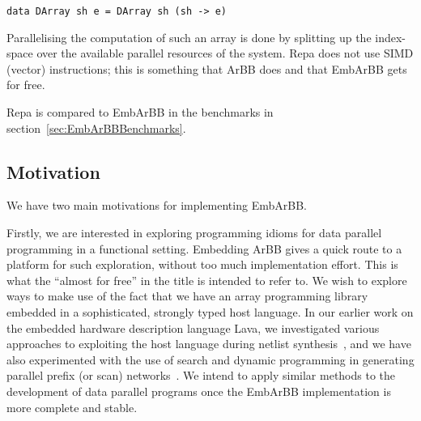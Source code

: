 \begin{verbatim} 
data DArray sh e = DArray sh (sh -> e)  
\end{verbatim} 

Parallelising the computation of such an array is done by splitting up the 
index-space over the available parallel resources of the system. Repa does 
not use SIMD (vector) instructions; this is something that ArBB does and 
that EmbArBB gets for free. 

Repa is compared to EmbArBB in the benchmarks in section~\ref{sec:EmbArBBBenchmarks}.


\subsection{Motivation}

We have two main motivations for implementing EmbArBB.

Firstly, we are interested in exploring programming idioms for
data parallel programming in a functional setting. Embedding ArBB gives
a quick route to a platform for such exploration, without too much implementation effort. This is what the ``almost for free'' in the title is intended to refer to.
We wish to explore ways to make use of the fact that we have an array programming library embedded in a sophisticated, strongly typed host language. In our earlier work on the embedded hardware description language Lava, we investigated various approaches to exploiting the host language during netlist synthesis~, and we have also experimented with the use of search and dynamic programming in generating parallel prefix (or scan) networks~. We intend to apply similar methods to the development of data parallel programs once the EmbArBB implementation is more complete and stable.




